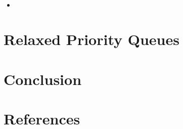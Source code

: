 \documentclass[usenames,dvipsnames]{beamer}
\begin{document}
\begin{frame}{}
\framesubtitle{\citeauthor{shavit2000skiplist}}

\begin{itemize}
\item
\end{itemize}
\end{frame}

\section{Relaxed Priority Queues} \label{sec:relaxed}

\begin{frame}{}

\end{frame}

\section{Conclusion} \label{sec:conclusion}

\begin{frame}{}

\end{frame}

\section{References} \label{sec:references}

\begin{frame}[allowframebreaks]{}
\printbibliography
\end{frame}
\end{document}
